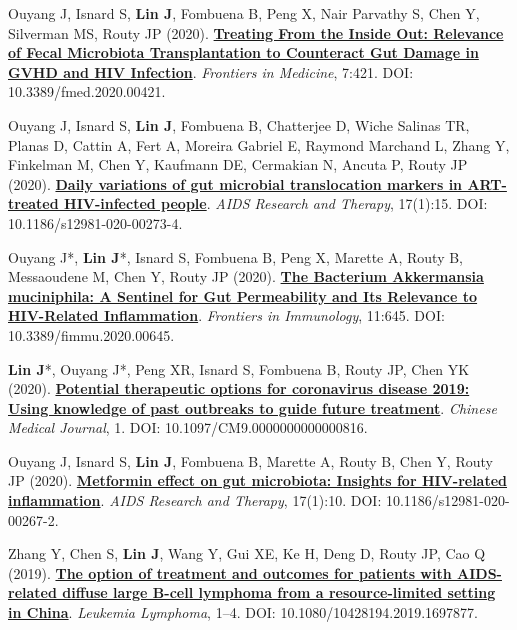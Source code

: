 \documentclass[letterpaper,11pt]{article}
\newcounter{journalCounter}
\newcommand{\jref}{%
    \stepcounter{journalCounter}%
    \textbf{[J.\thejournalCounter]}%
}
\begin{document}
\item[\jref] Ouyang J, Isnard S, \textbf{Lin J}, Fombuena B, Peng X, Nair Parvathy S, Chen Y, Silverman MS, Routy JP (2020). \href{https://doi.org/10.3389/fmed.2020.00421}{\textbf{Treating From the Inside Out: Relevance of Fecal Microbiota Transplantation to Counteract Gut Damage in GVHD and HIV Infection}}. \textit{Frontiers in Medicine}, 7:421. DOI: 10.3389/fmed.2020.00421.

\item[\jref] Ouyang J, Isnard S, \textbf{Lin J}, Fombuena B, Chatterjee D, Wiche Salinas TR, Planas D, Cattin A, Fert A, Moreira Gabriel E, Raymond Marchand L, Zhang Y, Finkelman M, Chen Y, Kaufmann DE, Cermakian N, Ancuta P, Routy JP (2020). \href{https://doi.org/10.1186/s12981-020-00273-4}{\textbf{Daily variations of gut microbial translocation markers in ART-treated HIV-infected people}}. \textit{AIDS Research and Therapy}, 17(1):15. DOI: 10.1186/s12981-020-00273-4.

\item[\jref] Ouyang J*, \textbf{Lin J}*, Isnard S, Fombuena B, Peng X, Marette A, Routy B, Messaoudene M, Chen Y, Routy JP (2020). \href{https://doi.org/10.3389/fimmu.2020.00645}{\textbf{The Bacterium Akkermansia muciniphila: A Sentinel for Gut Permeability and Its Relevance to HIV-Related Inflammation}}. \textit{Frontiers in Immunology}, 11:645. DOI: 10.3389/fimmu.2020.00645.

\item[\jref] \textbf{Lin J}*, Ouyang J*, Peng XR, Isnard S, Fombuena B, Routy JP, Chen YK (2020). \href{https://doi.org/10.1097/CM9.0000000000000816}{\textbf{Potential therapeutic options for coronavirus disease 2019: Using knowledge of past outbreaks to guide future treatment}}. \textit{Chinese Medical Journal}, 1. DOI: 10.1097/CM9.0000000000000816.

\item[\jref] Ouyang J, Isnard S, \textbf{Lin J}, Fombuena B, Marette A, Routy B, Chen Y, Routy JP (2020). \href{https://doi.org/10.1186/s12981-020-00267-2}{\textbf{Metformin effect on gut microbiota: Insights for HIV-related inflammation}}. \textit{AIDS Research and Therapy}, 17(1):10. DOI: 10.1186/s12981-020-00267-2.

\item[\jref] Zhang Y, Chen S, \textbf{Lin J}, Wang Y, Gui XE, Ke H, Deng D, Routy JP, Cao Q (2019). \href{https://doi.org/10.1080/10428194.2019.1697877}{\textbf{The option of treatment and outcomes for patients with AIDS-related diffuse large B-cell lymphoma from a resource-limited setting in China}}. \textit{Leukemia Lymphoma}, 1–4. DOI: 10.1080/10428194.2019.1697877.
\end{document}
